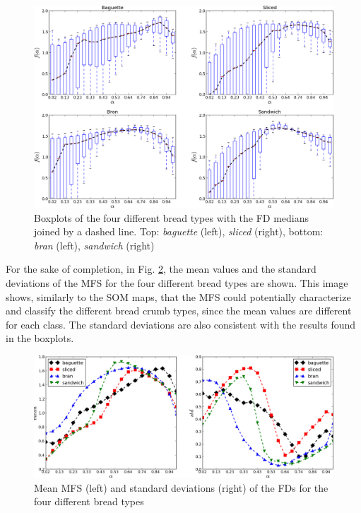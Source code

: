 \begin{figure}
\centering
\includegraphics[scale=0.52]{../images/Fig5}
\caption{Boxplots of the four different bread types with the FD medians joined by a dashed line. Top: {\em baguette} (left), {\em sliced} (right), bottom: {\em bran} (left), {\em sandwich} (right)}
\label{fig:boxplotsMFS}
\end{figure}


For the sake of completion, in Fig. \ref{fig:meansMFS}, the mean values and the standard deviations of the MFS for the four different bread types are shown. This image shows, similarly to the SOM maps, that the MFS could potentially characterize and classify the different bread crumb types, since the mean values are different for each class. The standard deviations are also consistent with the results found in the boxplots. 

\begin{figure}
\centering
\includegraphics[scale=0.5]{../images/Fig6}
\caption{Mean MFS (left) and standard deviations (right) of the FDs for the four different bread types}
\label{fig:meansMFS}
\end{figure}

